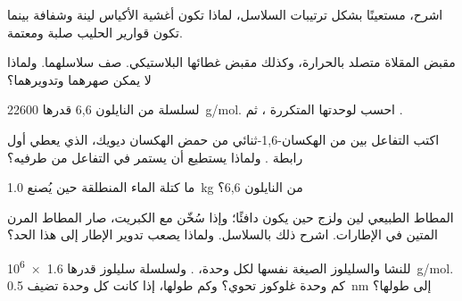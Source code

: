 \begin{exercise}[$\star\star$]\label{exo:g12:polymers:9}
اشرح، مستعينًا بشكل ترتيبات السلاسل، لماذا تكون أغشية الأكياس لينة
وشفافة بينما تكون قوارير الحليب صلبة ومعتمة.
\end{exercise}

\begin{exercise}[$\star\star$]\label{exo:g12:polymers:10}
مقبض المقلاة متصلد بالحرارة، وكذلك مقبض غطائها البلاستيكي. صف
سلاسلهما. ولماذا لا يمكن صهرهما وتدويرهما؟
\end{exercise}

\begin{exercise}[$\star\star$]\label{exo:g12:polymers:11}
لسلسلة من النايلون 6,6  قدرها \qty{22600}{g/mol}. احسب
 لوحدتها المتكررة ، ثم .
\end{exercise}

\begin{exercise}[$\star\star\star$]\label{exo:g12:polymers:12}
اكتب التفاعل بين  من الهكسان-1,6-ثنائي   من
حمض الهكسان ديويك، الذي يعطي أول رابطة . ولماذا يستطيع  أن يستمر في
التفاعل من طرفيه؟
\end{exercise}

\begin{exercise}[$\star\star\star$]\label{exo:g12:polymers:13}
ما كتلة الماء المنطلقة حين يُصنع \qty{1.0}{kg} من النايلون 6,6؟
\end{exercise}

\begin{exercise}[$\star\star\star$]\label{exo:g12:polymers:14}
المطاط الطبيعي لين ولزج حين يكون دافئًا؛ وإذا سُخّن مع الكبريت،
صار المطاط المرن المتين في الإطارات. اشرح ذلك بالسلاسل.
ولماذا يصعب تدوير الإطار إلى هذا الحد؟
\end{exercise}

\begin{exercise}[$\star\star\star$]\label{exo:g12:polymers:15}
للنشا والسليلوز الصيغة نفسها لكل وحدة، . ولسلسلة
سليلوز  قدرها \qty{1.6e6}{g/mol}. كم وحدة غلوكوز
تحوي؟ وكم طولها، إذا كانت كل وحدة تضيف \qty{0.5}{nm} إلى
طولها؟
\end{exercise}

